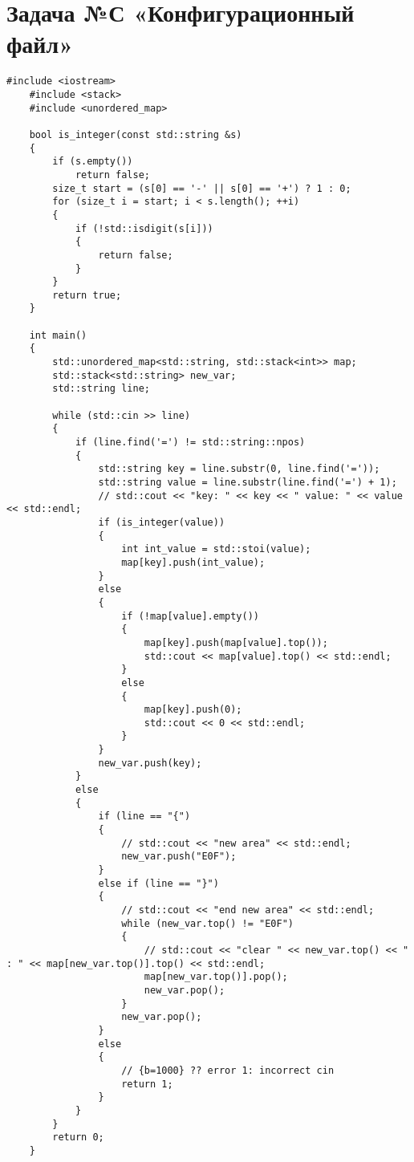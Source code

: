 \documentclass{article}
\begin{document}
\section{Задача №С «Конфигурационный файл»}
\begin{lstlisting}[frame=single, basicstyle=\ttfamily, breaklines=true, breakatwhitespace=true, postbreak=\mbox{\textcolor{red}{$\hookrightarrow$}\space}]
    #include <iostream>
    #include <stack>
    #include <unordered_map>
    
    bool is_integer(const std::string &s)
    {
        if (s.empty())
            return false;
        size_t start = (s[0] == '-' || s[0] == '+') ? 1 : 0;
        for (size_t i = start; i < s.length(); ++i)
        {
            if (!std::isdigit(s[i]))
            {
                return false;
            }
        }
        return true;
    }
    
    int main()
    {
        std::unordered_map<std::string, std::stack<int>> map;
        std::stack<std::string> new_var;
        std::string line;
    
        while (std::cin >> line)
        {
            if (line.find('=') != std::string::npos)
            {
                std::string key = line.substr(0, line.find('='));
                std::string value = line.substr(line.find('=') + 1);
                // std::cout << "key: " << key << " value: " << value << std::endl;
                if (is_integer(value))
                {
                    int int_value = std::stoi(value);
                    map[key].push(int_value);
                }
                else
                {
                    if (!map[value].empty())
                    {
                        map[key].push(map[value].top());
                        std::cout << map[value].top() << std::endl;
                    }
                    else
                    {
                        map[key].push(0);
                        std::cout << 0 << std::endl;
                    }
                }
                new_var.push(key);
            }
            else
            {
                if (line == "{")
                {
                    // std::cout << "new area" << std::endl;
                    new_var.push("E0F");
                }
                else if (line == "}")
                {
                    // std::cout << "end new area" << std::endl;
                    while (new_var.top() != "E0F")
                    {
                        // std::cout << "clear " << new_var.top() << " : " << map[new_var.top()].top() << std::endl;
                        map[new_var.top()].pop();
                        new_var.pop();
                    }
                    new_var.pop();
                }
                else
                {
                    // {b=1000} ?? error 1: incorrect cin
                    return 1;
                }
            }
        }
        return 0;
    }
\end{lstlisting}
\end{document}
